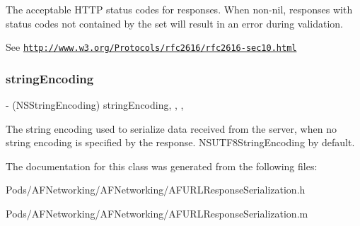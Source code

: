The acceptable H\+T\+TP status codes for responses. When non-\/{\ttfamily nil}, responses with status codes not contained by the set will result in an error during validation.

See \href{http://www.w3.org/Protocols/rfc2616/rfc2616-sec10.html}{\tt http\+://www.\+w3.\+org/\+Protocols/rfc2616/rfc2616-\/sec10.\+html} \mbox{\label{interface_a_f_h_t_t_p_response_serializer_a91382381388e01522dabf5c81e91ca62}} 
\subsubsection{\texorpdfstring{string\+Encoding}{stringEncoding}}
{\footnotesize\ttfamily -\/ (N\+S\+String\+Encoding) string\+Encoding\hspace{0.3cm}{\ttfamily [read]}, {\ttfamily [write]}, {\ttfamily [nonatomic]}, {\ttfamily [assign]}}

The string encoding used to serialize data received from the server, when no string encoding is specified by the response. {\ttfamily N\+S\+U\+T\+F8\+String\+Encoding} by default. 

The documentation for this class was generated from the following files\+:\begin{DoxyCompactItemize}
\item 
Pods/\+A\+F\+Networking/\+A\+F\+Networking/A\+F\+U\+R\+L\+Response\+Serialization.\+h\item 
Pods/\+A\+F\+Networking/\+A\+F\+Networking/A\+F\+U\+R\+L\+Response\+Serialization.\+m\end{DoxyCompactItemize}
